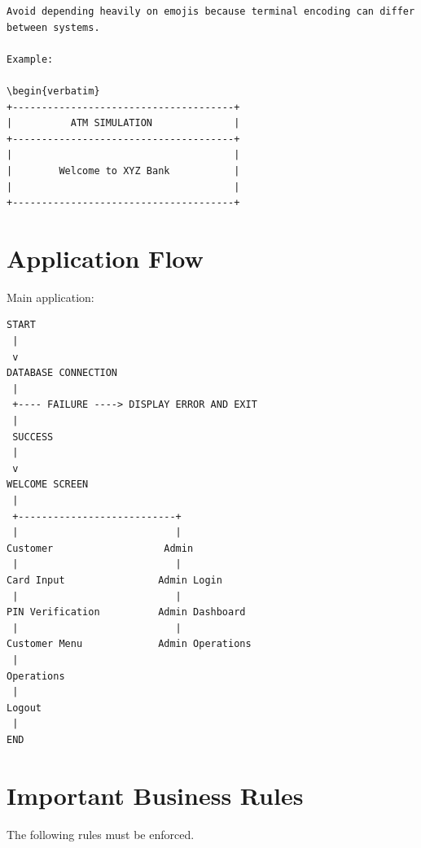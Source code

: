 \documentclass[12pt,a4paper]{article}
\begin{document}
\begin{verbatim}
Avoid depending heavily on emojis because terminal encoding can differ
between systems.

Example:

\begin{verbatim}
+--------------------------------------+
|          ATM SIMULATION              |
+--------------------------------------+
|                                      |
|        Welcome to XYZ Bank           |
|                                      |
+--------------------------------------+
\end{verbatim}


\section{Application Flow}

Main application:

\begin{verbatim}
START
 |
 v
DATABASE CONNECTION
 |
 +---- FAILURE ----> DISPLAY ERROR AND EXIT
 |
 SUCCESS
 |
 v
WELCOME SCREEN
 |
 +---------------------------+
 |                           |
Customer                   Admin
 |                           |
Card Input                Admin Login
 |                           |
PIN Verification          Admin Dashboard
 |                           |
Customer Menu             Admin Operations
 |
Operations
 |
Logout
 |
END
\end{verbatim}


\section{Important Business Rules}

The following rules must be enforced.
\end{document}
